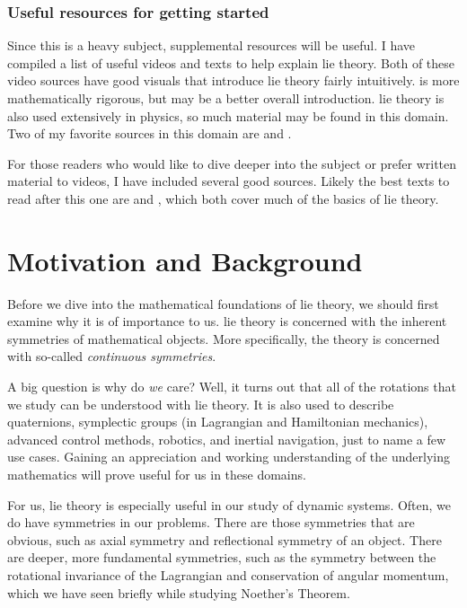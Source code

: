 \subsubsection{Useful resources for getting started}

Since this is a heavy subject, supplemental resources will be useful. I have compiled a list of useful videos and texts to help explain \gls{lie theory}. Both of these video sources have good visuals that introduce \gls{lie theory} fairly intuitively. \cite{michael_penn_maths_2021} is more mathematically rigorous, but \cite{mathemaniac_what_2023} may be a better overall introduction. \gls{lie theory} is also used extensively in physics, so much material may be found in this domain. Two of my favorite sources in this domain are \cite{eigenchris_spinors_nodate} and \cite{zee_group_2016}.

For those readers who would like to dive deeper into the  subject or prefer written material to videos, I have included several good sources. Likely the best texts to read after this one are \cite{stillwell_naive_2008} and \cite{hall_lie_2015}, which both cover much of the basics of \gls{lie theory}.

\section{Motivation and Background}\label{sec:motivation and background lie}

Before we dive into the mathematical foundations of \gls{lie theory}, we should first examine why it is of importance to us. \gls{lie theory} is concerned with the inherent symmetries of mathematical objects. More specifically, the theory is concerned with so-called \textit{continuous symmetries}.

A big question is why do \textit{we} care? Well, it turns out that all of the rotations that we study can be understood with \gls{lie theory}. It is also used to describe quaternions, symplectic groups (in Lagrangian and Hamiltonian mechanics), advanced control methods, robotics, and inertial navigation, just to name a few use cases. Gaining an appreciation and working understanding of the underlying mathematics will prove useful for us in these domains.

For us, \gls{lie theory} is especially useful in our study of dynamic systems. Often, we do have symmetries in our problems. There are those symmetries that are obvious, such as axial symmetry and reflectional symmetry of an object. There are deeper, more fundamental symmetries, such as the symmetry between the rotational invariance of the Lagrangian and conservation of angular momentum, which we have seen briefly while studying Noether's Theorem.

